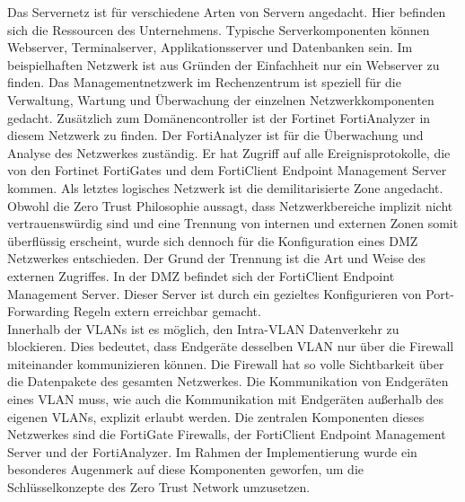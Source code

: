 \documentclass[lettersize,journal]{IEEEtran}
\begin{document}
Das Servernetz ist für verschiedene Arten von Servern angedacht. Hier befinden sich die Ressourcen des Unternehmens. Typische Serverkomponenten können Webserver, Terminalserver, Applikationsserver und Datenbanken sein. Im beispielhaften Netzwerk ist aus Gründen der Einfachheit nur ein Webserver zu finden. Das Managementnetzwerk im Rechenzentrum ist speziell für die Verwaltung, Wartung und Überwachung der einzelnen Netzwerkkomponenten gedacht. Zusätzlich zum Domänencontroller ist der Fortinet FortiAnalyzer in diesem Netzwerk zu finden. Der FortiAnalyzer ist für die Überwachung und Analyse des Netzwerkes zuständig. Er hat Zugriff auf alle Ereignisprotokolle, die von den Fortinet FortiGates und dem FortiClient Endpoint Management Server kommen. Als letztes logisches Netzwerk ist die demilitarisierte Zone angedacht. Obwohl die Zero Trust Philosophie aussagt, dass Netzwerkbereiche implizit nicht vertrauenswürdig sind und eine Trennung von internen und externen Zonen somit überflüssig erscheint, wurde sich dennoch für die Konfiguration eines DMZ Netzwerkes entschieden. Der Grund der Trennung ist die Art und Weise des externen Zugriffes. In der DMZ befindet sich der FortiClient Endpoint Management Server. Dieser Server ist durch ein gezieltes Konfigurieren von Port-Forwarding Regeln extern erreichbar gemacht.\\
Innerhalb der VLANs ist es möglich, den Intra-VLAN Datenverkehr zu blockieren. Dies bedeutet, dass Endgeräte desselben VLAN nur über die Firewall miteinander kommunizieren können. Die Firewall hat so volle Sichtbarkeit über die Datenpakete des gesamten Netzwerkes. Die Kommunikation von Endgeräten eines VLAN muss, wie auch die Kommunikation mit Endgeräten außerhalb des eigenen VLANs, explizit erlaubt werden. Die zentralen Komponenten dieses Netzwerkes sind die FortiGate Firewalls, der FortiClient Endpoint Management Server und der FortiAnalyzer. Im Rahmen der Implementierung wurde ein besonderes Augenmerk auf diese Komponenten geworfen, um die Schlüsselkonzepte des Zero Trust Network umzusetzen.
\end{document}
